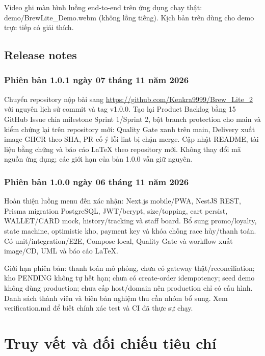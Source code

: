 \documentclass[a4paper,12pt,oneside]{report}
\begin{document}
Video ghi màn hình luồng end-to-end trên ứng dụng chạy thật: {\small\ttfamily demo/\allowbreak{}BrewLite\_\allowbreak{}Demo.\allowbreak{}webm} (không lồng tiếng). Kịch bản trên dùng cho demo trực tiếp có giải thích.


\section{Release notes}

\subsection{Phiên bản 1.0.1 ngày 07 tháng 11 năm 2026}
Chuyển repository nộp bài sang \url{https://github.com/Kenkra9999/Brew_Lite_2} với nguyên lịch sử commit và tag {\small\ttfamily v1.\allowbreak{}0.\allowbreak{}0}. Tạo lại Product Backlog bằng 15 GitHub Issue chia milestone Sprint 1/\allowbreak{}Sprint 2, bật branch protection cho {\small\ttfamily main} và kiểm chứng lại trên repository mới: Quality Gate xanh trên {\small\ttfamily main}, Delivery xuất image GHCR theo SHA, PR cố ý lỗi lint bị chặn merge. Cập nhật README, tài liệu bằng chứng và báo cáo LaTeX theo repository mới. Không thay đổi mã nguồn ứng dụng; các giới hạn của bản 1.0.0 vẫn giữ nguyên.


\subsection{Phiên bản 1.0.0 ngày 06 tháng 11 năm 2026}
Hoàn thiện luồng menu đến xác nhận: Next.js mobile/\allowbreak{}PWA, NestJS REST, Prisma migration PostgreSQL, JWT/\allowbreak{}bcrypt, size/\allowbreak{}topping, cart persist, WALLET/\allowbreak{}CARD mock, history/\allowbreak{}tracking và staff board. Bổ sung promo/\allowbreak{}loyalty, state machine, optimistic kho, payment key và khóa chống race hủy/\allowbreak{}thanh toán. Có unit/\allowbreak{}integration/\allowbreak{}E2E, Compose local, Quality Gate và workflow xuất image/\allowbreak{}CD, UML và báo cáo LaTeX.


Giới hạn phiên bản: thanh toán mô phỏng, chưa có gateway thật/\allowbreak{}reconciliation; kho PENDING không tự hết hạn; chưa có create-order idempotency; seed demo không dùng production; chưa cấp host/\allowbreak{}domain nên production chỉ có cấu hình. Danh sách thành viên và biên bản nghiệm thu cần nhóm bổ sung. Xem verification.md để biết chính xác test và CI đã thực sự chạy.


\chapter{Truy vết và đối chiếu tiêu chí}
\end{document}
